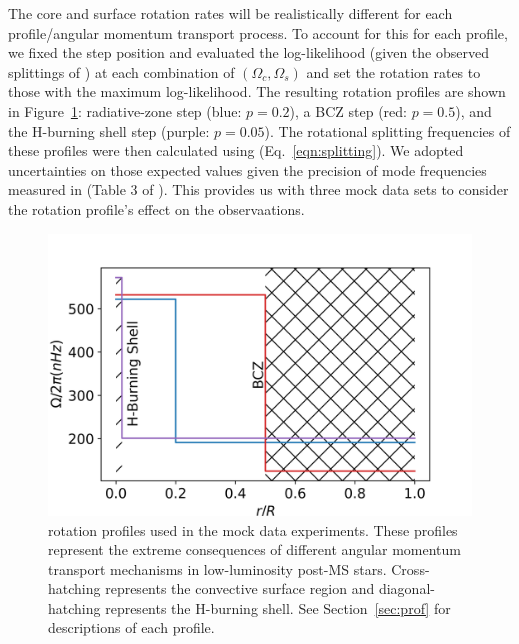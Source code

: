 The core and surface rotation rates will be realistically different for each profile/angular momentum transport process. To account for this for each profile, we fixed the step position and evaluated the log-likelihood (given the observed splittings of \thestar) at each combination of $(\Omega_c,\Omega_s)$ and set the rotation rates to those with the maximum log-likelihood. The resulting rotation profiles are shown in Figure~\ref{fig:5rotprof}: radiative-zone step (blue: $p = 0.2$), a BCZ step (red: $p = 0.5$), and the H-burning shell step (purple: $p = 0.05$).
The rotational splitting frequencies of these profiles were then calculated using  (Eq.~\ref{eqn:splitting}). 
We adopted uncertainties on those expected values given the precision of mode frequencies measured in \thestar{} (Table 3 of \citet{deheuvels_seismic_2014}). This provides us with three mock data sets to consider the rotation profile's effect on the observaations.


\begin{figure}
\centering
    \includegraphics[width=\textwidth]{Figures/subgiant_chapter_figures/rots.png}
    \caption[Three rotation profiles used in the mock data experiments.]{ rotation profiles used in the mock data experiments. These profiles represent the extreme consequences of different angular momentum transport mechanisms in low-luminosity post-MS stars. Cross-hatching represents the convective surface region and diagonal-hatching represents the H-burning shell. See Section~\ref{sec:prof} for descriptions of each profile.}
    \label{fig:5rotprof}
\end{figure}




